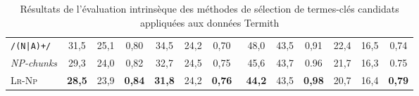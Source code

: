 \begin{table}[t]
{\begin{tabular}{l|cc|c|cc|c|cc|c|cc|c}
              \texttt{/(N|A)+/} & 31,5 & 25,1 & 0,80 & 34,5 & 24,2 & 0,70 & $~~$48,0 & 43,5 & 0,91 & 22,4 & 16,5 & 0,74\\
              \textit{NP-chunks} & 29,3 & 24,0 & 0,82 & 32,7 & 24,5 & 0,75 & $~~$45,6 & 43,7 & 0.96 & 21,7 & 16,3 & 0.75\\
              \textsc{Lr-Np} & \textbf{28,5} & 23,9 & \textbf{0,84} & \textbf{31,8} & 24,2 & \textbf{0,76} &\textbf{ $~~$44,2} & 43,5 & \textbf{0,98} & 20,7 & 16,4 & \textbf{0,79}\\
              \bottomrule
            \end{tabular}
          }
          \caption{Résultats de l'évaluation intrinsèque des méthodes de
                   sélection de termes-clés candidats appliquées aux données
                   Termith
                   \label{tab:candidate_extraction_statistics_termith}}
        \end{table}
